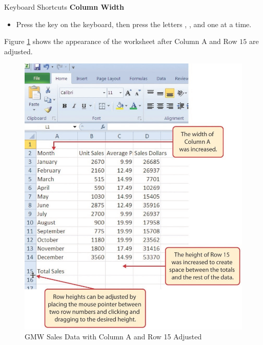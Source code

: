 \begin{center}
	\begin{shtcutbox}{Keyboard Shortcuts}
		\textbf{Column Width}
		\\
		\begin{itemize}
			\setlength{\itemsep}{0pt}
			\setlength{\parskip}{0pt}
			\setlength{\parsep}{0pt}
			
			\item Press the  key on the keyboard, then press the letters , , and  one at a time.
			
		\end{itemize}
	\end{shtcutbox}
\end{center}

Figure \ref{01:fig25} shows the appearance of the worksheet after Column A and Row $ 15 $ are adjusted.

\begin{figure}[H]
	\centering
	\includegraphics[width=\maxwidth{.95\linewidth}]{gfx/ch01_fig25}
	\caption{GMW Sales Data with Column A and Row 15 Adjusted}
	\label{01:fig25}
\end{figure}

